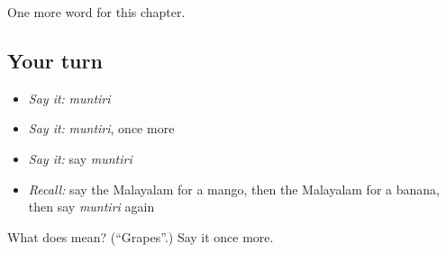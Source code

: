\begin{grammarlens}[title={What you've built}]
One more word for this chapter.
\end{grammarlens}

\subsection*{Your turn}
\begin{itemize}
\raggedright
  \item \emph{Say it:} \emph{muntiri}
  \item \emph{Say it:} \emph{muntiri}, once more
  \item \emph{Say it:} say \emph{muntiri}
  \item \emph{Recall:} say the Malayalam for a mango, then the Malayalam for a banana, then say \emph{muntiri} again
\end{itemize}

\begin{tcolorbox}[breakable,colback=teal!4,colframe=teal!35!black,title={Before you move on}]
What does  mean? (\textquotedblleft{}Grapes\textquotedblright{}.) Say it once more.
\end{tcolorbox}
